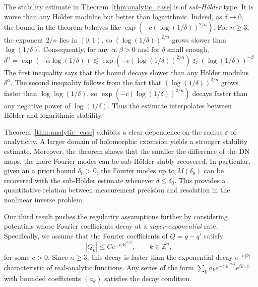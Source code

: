 \documentclass[a4paper, 11pt, twoside, notitlepage]{amsart}
\theoremstyle{definition}
\theoremstyle{remark}
\begin{document}
The stability estimate in Theorem~\ref{thm:analytic_case} is of \emph{sub-Hölder} type. It is worse than any Hölder modulus but better than logarithmic. Indeed, as $\delta \to 0$, the bound in the theorem behaves like $\exp(-c (\log(1/\delta))^{2/n})$. For $n \geq 3$, the exponent $2/n$ lies in $(0,1)$, so $(\log(1/\delta))^{2/n}$ grows slower than $\log(1/\delta)$. Consequently, for any $\alpha, \beta > 0$ and for $\delta$ small enough, 
\[
\delta^\alpha = \exp(-\alpha \log(1/\delta)) \lesssim \exp(-c (\log(1/\delta))^{2/n}) \lesssim (\log(1/\delta))^{-\beta}
\]
The first inequality says that the bound decays slower than any Hölder modulus $\delta^\alpha$. The second inequality follows from the fact that $(\log(1/\delta))^{2/n}$ grows faster than $\log\log(1/\delta)$, so $\exp(-c (\log(1/\delta))^{2/n})$ decays faster than any negative power of $\log(1/\delta)$. Thus the estimate interpolates between Hölder and logarithmic stability.

Theorem~\ref{thm:analytic_case} exhibits a clear dependence on the radius $\varepsilon$ of analyticity. A larger domain of holomorphic extension yields a stronger stability estimate. Moreover, the theorem shows that the smaller the difference of the DN maps, the more Fourier modes can be sub-Hölder stably recovered. In particular, given an a priori bound $\delta_0 > 0$, the Fourier modes up to $M(\delta_0)$ can be recovered with the sub-Hölder estimate  whenever $\delta \leq \delta_0$. This provides a quantitative relation between measurement precision and resolution in the nonlinear inverse problem.

Our third result pushes the regularity assumptions further by considering potentials whose Fourier coefficients decay at a \emph{super-exponential} rate. Specifically, we assume that the Fourier coefficients of $Q = q - q'$ satisfy
\begin{equation}\label{eq:stretched_decay_intro}
|Q_k| \leq C e^{-c |k|^{n/2}}, \qquad k \in \mathbb{Z}^n,
\end{equation}
for some $c > 0$. Since $n \geq 3$, this decay is faster than the exponential decay $e^{-\sigma|k|}$ characteristic of real-analytic functions. %
Any series of the form $\sum_{k} a_k e^{-c |k|^{n/2}} e^{i k \cdot x}$ with bounded coefficients $(a_k)$ satisfies the decay condition.
\end{document}
